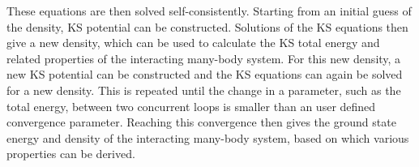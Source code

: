 \documentclass[12pt,a4paper,twoside]{article}
\numberwithin{equation}{section}
\renewcommand{\_}{\textscale{.7}{\textunderscore}}
\begin{document}

These equations are then solved self-consistently. Starting from an initial guess of the density, KS potential can be constructed. Solutions of the KS equations then give a new density, which can be used to calculate the KS total energy and related properties of the interacting many-body system. For this new density, a new KS potential can be constructed and the KS equations can again be solved for a new density. This is repeated until the change in a parameter, such as the total energy, between two concurrent loops is smaller than an user defined convergence parameter. Reaching this convergence then gives the ground state energy and density of the interacting many-body system, based on which various properties can be derived.
\end{document}

